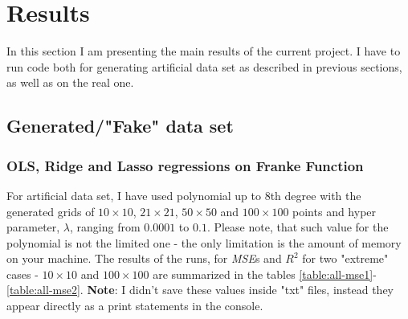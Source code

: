 \section{Results}
\label{sec:results}


In this section I am presenting the main results of the current project. I have to run code both for generating artificial data set as described in previous sections, as well as on the real one.

\subsection{Generated/"Fake" data set}
\subsubsection{OLS, Ridge and Lasso regressions on Franke Function}
For artificial data set, I have used polynomial up to 8th degree with the generated grids of $10\times10$, $21\times21$, $50\times50$ and $100\times100$ points and hyper parameter, $\lambda$, ranging from $0.0001$ to $0.1$. Please note, that such value for the polynomial is not the limited one - the only limitation is the amount of memory on your machine. The results of the runs, for \textit{MSE}s and $R^2$  for two "extreme" cases - $10\times10$ and $100\times100$ are summarized in the tables \ref{table:all-mse1}-\ref{table:all-mse2}. \textbf{Note}: I didn't save these values inside "txt" files, instead they appear directly as a print statements in the console.

